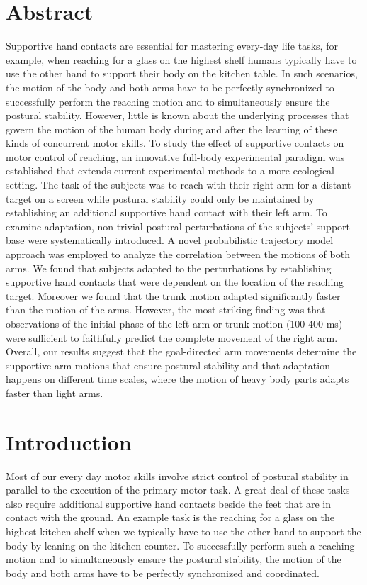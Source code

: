 

\section*{Abstract}
Supportive hand contacts are essential for mastering every-day life tasks, for 
example, when reaching for a glass on the highest shelf humans typically have to 
use the other hand to support their body on the kitchen table. In such 
scenarios, the motion of the body and both arms have to be perfectly 
synchronized to successfully perform the reaching motion and to simultaneously 
ensure the postural stability. However, little is known about the underlying 
processes that govern the motion of the human body during and after the learning 
of these kinds of concurrent motor skills. To study the effect of supportive 
contacts on motor control of reaching, an innovative full-body experimental 
paradigm was established that extends current experimental methods to a more 
ecological setting. The task of the subjects was to reach with their right arm 
for a distant target on a screen while postural stability could only be 
maintained by establishing an additional supportive hand contact with their left 
arm. To examine adaptation, non-trivial postural perturbations of the subjects' 
support base were systematically introduced. A novel probabilistic trajectory 
model approach was employed to analyze the correlation between the motions of 
both arms. We found that subjects adapted to the perturbations by establishing 
supportive hand contacts that were dependent on the location of the reaching 
target. Moreover we found that the trunk motion adapted significantly faster 
than the motion of the arms. However, the most striking finding was that 
observations of the initial phase of the left arm or trunk motion (100-400 ms) 
were sufficient to faithfully predict the complete movement of the right arm. 
Overall, our results suggest that the goal-directed arm movements determine the 
supportive arm motions that ensure postural stability and that adaptation 
happens on different time scales, where the motion of heavy body parts adapts 
faster than light arms. 

\section*{Introduction}
Most of our every day motor skills involve strict control of postural stability 
in parallel to the execution of the primary motor task. A great deal of these 
tasks also require additional supportive hand contacts beside the feet that are in contact with the ground. An example task is the reaching for a glass on 
the highest kitchen shelf when we typically have to use the other hand to 
support the body by leaning on the kitchen counter. To successfully perform such a reaching 
motion and to simultaneously ensure the postural stability, the motion of the 
body and both arms have to be perfectly synchronized and coordinated.

